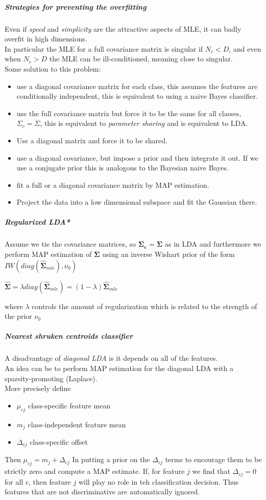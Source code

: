 \subparagraph{Strategies for preventing the overfitting}
Even if \textit{speed} and \textit{simplicity} are the attractive aspects of MLE, it can
badly overfit in high dimensions.\\
In particular the MLE for a full covariance matrix is singular if $N_{c} < D$, and even
when $N_{c} > D$ the MLE can be ill-conditioned, meaning close to singular.\\
Some solution to this problem:
\begin{itemize}
    \item use a diagonal covariance matrix for each class, this assumes the features are
        conditionally independent, this is equivalent to using a naive Bayes classifier.
    \item use the full covariance matrix but force it to be the same for all classes, 
        $\Sigma_{c} = \Sigma$, this is equivalent to \textit{parameter sharing} and is
        equivalent to LDA.
    \item Use a diagonal matrix and force it to be shared.
    \item use a diagonal covariance, but impose a prior and then integrate it out. If we 
        use a conjugate prior this is analogous to the Bayesian naive Bayes.
    \item fit a full or a diagonal covariance matrix by MAP estimation.
    \item Project the data into a low dimensional subspace and fit the Gaussian there.
\end{itemize}

\subparagraph{Regularized LDA*}
Assume we tie the covariance matrices, so $\bm{\Sigma_{c}} = \bm{\Sigma}$ as in LDA and 
furthermore we perform MAP estimation of $\bm{\Sigma}$ using an inverse Wishart prior 
of the form $IW(diag(\hat{\bm{\Sigma}}_{mle}), \nu_{0})$
\begin{center}
$\hat{\bm{\Sigma}} = \lambda diag(\hat{\bm{\Sigma}}_{mle}) =
(1-\lambda)\hat{\bm{\Sigma}}_{mle}$
\end{center}
where $\lambda$ controls the amount of regularization which is related to the strength of the prior $\nu_{0}$

\subparagraph{Nearest shruken centroids classifier}
A disadvantage of \textit{diagonal LDA} is it depends on all of the features.\\
An idea can be to perform MAP estimation for the diagonal LDA with a sparsity-promoting 
(Laplace).\\
More precisely define
\begin{itemize}
    \item $\mu_{cj}$ class-specific feature mean 
    \item $m_{j}$ class-independent feature mean
    \item $\Delta_{cj}$ class-specific offset
\end{itemize}
Then $\mu_{cj} = m_{j} + \Delta_{cj}$
In putting a prior on the $\Delta_{cj}$ terms to encourage them to be strictly zero and 
compute a MAP estimate. If, for feature $j$ we find that $\Delta_{cj}=0$ for all $c$, 
then feature $j$ will play no role in teh classification decision. Thus features that are 
not discriminative are automatically ignored.

